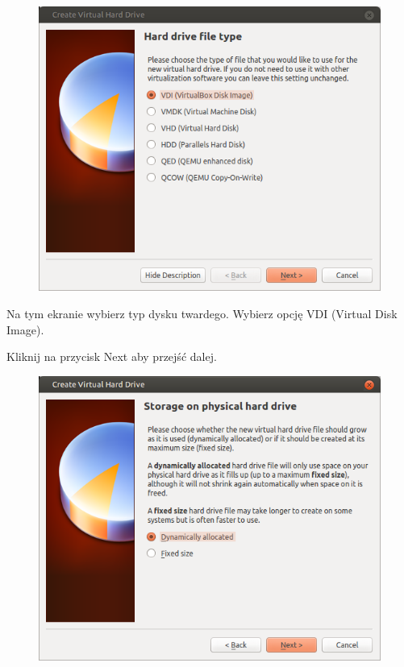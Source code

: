 \begin{figure}
	\vspace{-10pt}
	\includegraphics[width=\linewidth]{images/virtualbox_wizard4.png}
\end{figure}

Na tym ekranie wybierz typ dysku twardego. Wybierz opcję \textcolor{ubuntu_orange}{VDI (Virtual Disk Image)}.
\begin{flushright}
Kliknij na przycisk \textcolor{ubuntu_orange}{Next} aby przejść dalej.
\end{flushright}

\clearpage
\begin{figure}
	\vspace{-10pt}
	\includegraphics[width=\linewidth]{images/virtualbox_wizard5.png}
\end{figure}

